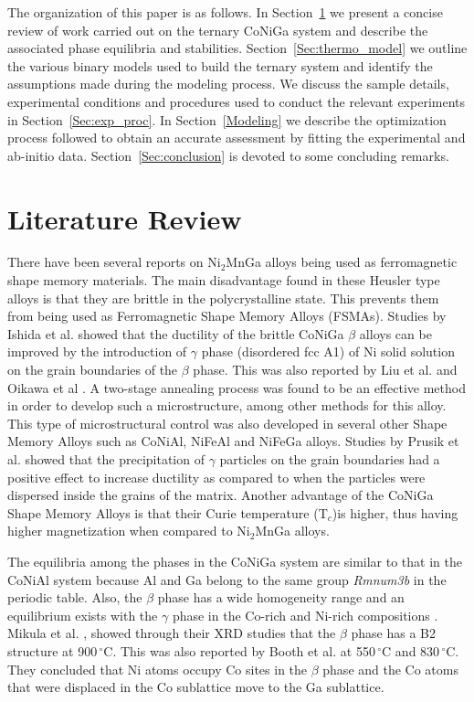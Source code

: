 \documentclass[article]{elsarticle}
\begin{document}
The organization of this paper is as follows. In Section~\ref{Sec:lit_review} we present a concise review of work carried out on the ternary CoNiGa system and describe the associated phase equilibria and stabilities. Section~\ref{Sec:thermo_model} we outline the various binary models used to build the ternary system and identify the assumptions made during the modeling process. We discuss the sample details, experimental conditions and procedures used to conduct the relevant experiments in Section~\ref{Sec:exp_proc}. In Section~\ref{Modeling} we describe the optimization process followed to obtain an accurate assessment by fitting the experimental and ab-initio data. Section~\ref{Sec:conclusion} is devoted to some concluding remarks. 
\section{Literature Review}
\label{Sec:lit_review}
There have been several reports on Ni$_{2}$MnGa alloys being used as ferromagnetic shape memory materials.
The main disadvantage found in these Heusler type alloys is that they are brittle in the polycrystalline
state. This prevents them from being used as Ferromagnetic Shape Memory Alloys (FSMAs). Studies by Ishida
et al. \cite{Ish91} showed that the ductility of the brittle CoNiGa $\beta$ alloys can be improved by the introduction of
$\gamma$ phase (disordered fcc A1) of Ni solid solution on the grain boundaries of the $\beta$ phase.
This was also reported by Liu et al. and Oikawa et al \cite{Liu07,Oik01}. A two-stage annealing process
was found to be an effective method in order to develop such a microstructure,
among other methods \cite{Oik06,Liu07,Oik01} for this alloy.
This type of microstructural control was also developed in several other Shape Memory Alloys such as CoNiAl\cite{Kain96,Tan06},
NiFeAl\cite{Kain92,Ono99} and NiFeGa alloys\cite{Duch08,Omo04,Oik02}. Studies by Prusik et al. \cite{Pru08} showed
that the precipitation of $\gamma$ particles on the grain boundaries had a positive effect to increase
ductility as compared to when the particles were dispersed inside the grains of the matrix. Another advantage of the
CoNiGa Shape Memory Alloys is that their Curie temperature (T$_{c}$)is higher, thus
having higher magnetization when compared to Ni$_{2}$MnGa alloys.

The equilibria among the phases in the
CoNiGa system are similar to that in the CoNiAl system because Al and Ga belong to the same group \textit{Rmnum{3}b} in the
periodic table. Also, the $\beta$ phase has a wide homogeneity range and an equilibrium exists with the
$\gamma$ phase in the Co-rich and Ni-rich compositions \cite{Oik01,Oikaw01,Liu06}. Mikula et al. \cite{Mik87},
showed through their XRD studies that the $\beta$ phase has a B2 structure at 900$\,^{\circ}\mathrm{C}$.
This was also reported by Booth et al.\cite{Boo78} at 550$\,^{\circ}\mathrm{C}$ and 830$\,^{\circ}\mathrm{C}$.
They concluded that Ni atoms occupy Co sites in the
$\beta$ phase and the Co atoms that were displaced in the Co sublattice move to the Ga sublattice.
\end{document}

